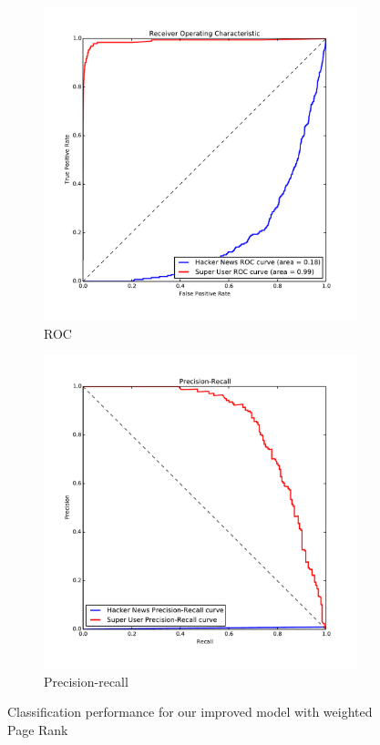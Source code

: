 \documentclass[10pt]{article}
\begin{document}
\begin{figure}[H]
\centering
\begin{subfigure}{0.5\textwidth}
\centering
\includegraphics[width=\linewidth]{classification_roc}
\caption{ROC}
\label{fig:roc}
\end{subfigure}%
\begin{subfigure}{0.5\textwidth}
\centering
\includegraphics[width=\linewidth]{classification_pr_curve}
\caption{Precision-recall}
\label{fig:pr-curve}
\end{subfigure}
\caption{Classification performance for our improved model with weighted Page
Rank}
\label{fig:classification}
\end{figure}
\end{document}
